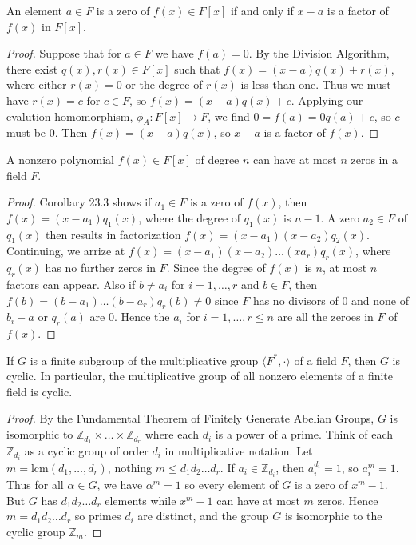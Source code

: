 \documentclass[a4paper,11pt]{article}
\begin{document}
\begin{outline}
    An element \(a \in F\) is a zero of \(f(x) \in F[x]\) if and only if \(x-a\) is a factor of \(f(x)\) in \(F[x]\).
    
    \begin{proof}
      Suppose that for \(a \in F\) we have \(f(a) = 0\). By the Division Algorithm, there exist \(q(x), r(x) \in F[x]\)
      such that \(f(x) = (x-a)q(x) + r(x)\), where either \(r(x) = 0\) or the degree of \(r(x)\) is less than one. Thus
      we must have \(r(x) = c\) for \(c \in F\), so \(f(x) = (x-a)q(x) + c\). Applying our evalution homomorphism, 
      \(\phi_A: F[x] \rightarrow F\), we find \(0 = f(a) = 0q(a) + c\), so \(c\) must be \(0\). Then \(f(x) = (x-a)q(x)\),
      so \(x - a\) is a factor of \(f(x)\).
    \end{proof}
      
    A nonzero polynomial \(f(x) \in F[x]\) of degree \(n\) can have at most \(n\) zeros in a field \(F\).
    
    \begin{proof}
      Corollary 23.3 shows if \(a_1 \in F\) is a zero of \(f(x)\), then \(f(x) = (x - a_1)q_1(x)\), where the degree
      of \(q_1(x)\) is \(n-1\). A zero \(a_2 \in F\) of \(q_1(x)\) then results in factorization 
      \(f(x) = (x-a_1)(x-a_2)q_2(x)\). Continuing, we arrize at \(f(x) = (x-a_1)(x-a_2)\ldots(xa_r)q_r(x)\), where
      \(q_r(x)\) has no further zeros in \(F\). Since the degree of \(f(x)\) is \(n\), at most \(n\) factors can appear.
      Also if \(b \neq a_i\) for \(i = 1, \ldots, r\) and \(b \in F\), then \(f(b) = (b-a_1)\ldots(b-a_r)q_r(b) \neq 0\)
      since \(F\) has no divisors of \(0\) and none of \(b_i - a\) or \(q_r(a)\) are \(0\). Hence the \(a_i\) for \(i =
      1,\ldots,r \leq n\) are all the zeroes in \(F\) of \(f(x)\).
    \end{proof}
      
    If \(G\) is a finite subgroup of the multiplicative group \(\langle F^{*}, \cdot \rangle\) of a field \(F\), 
    then \(G\) is cyclic. In particular, the multiplicative group of all nonzero elements of a finite field is cyclic.
    
    \begin{proof}
      By the Fundamental Theorem of Finitely Generate Abelian Groups, \(G\) is isomorphic to \(\mathbb{Z}_{d_1} \times
      \ldots \times \mathbb{Z}_{d_r}\) where each \(d_i\) is a power of a prime. Think of each \(\mathbb{Z}_{d_i}\) as
      a cyclic group of order \(d_i\) in multiplicative notation. Let \(m = \text{lcm}(d_1, \ldots, d_r)\), nothing
      \(m \leq d_1d_2\ldots d_r\). If \(a_i \in \mathbb{Z}_{d_i}\), then \(a_i^{d_i} = 1\), so \(a_i^m = 1\). Thus for
      all \(\alpha \in G\), we have \(\alpha^m = 1\) so every element of \(G\) is a zero of \(x^m - 1\). But \(G\) has
      \(d_1d_2\ldots d_r\) elements while \(x^m - 1\) can have at most \(m\) zeros. Hence \(m = d_1d_2 \ldots d_r\) so
      primes \(d_i\) are distinct, and the group \(G\) is isomorphic to the cyclic group \(\mathbb{Z}_m\).
    \end{proof}

\end{outline}
\end{document}
